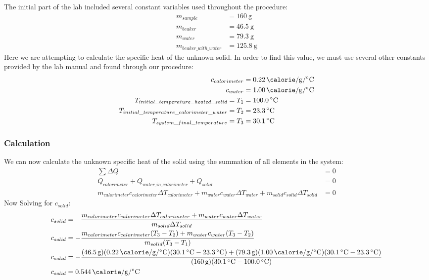 \documentclass{article}
\begin{document}
The initial part of the lab included several constant variables used throughout the procedure:
\begin{align*}
	m_{sample} & = \SI{160}{\gram} \\
	m_{beaker} & = \SI{46.5}{\gram} \\
	m_{water} & = \SI{79.3}{\gram} \\
	m_{beaker\_with\_water} & = \SI{125.8}{\gram}
\end{align*}
Here we are attempting to calculate the specific heat of the unknown solid. In order to find this value, we must use several other constants provided by the lab manual and found through our procedure:
\begin{align*}
	c_{calorimeter} & = \SI{0.22}{\calorie \per \gram \per \celsius} \\
	c_{water} & = \SI{1.00}{\calorie \per \gram \per \celsius} \\
	T_{initial\_temperature\_heated\_solid} = T_1 & = \SI{100.0}{\celsius} \\
	T_{initial\_temperature\_calorimeter\_water} = T_2 & = \SI{23.3}{\celsius} \\
	T_{system\_final\_temperature} = T_3 & = \SI{30.1}{\celsius}
\end{align*}

\subsubsection{Calculation}

We can now calculate the unknown specific heat of the solid using the summation of all elements in the system:
\begin{align*}
	\sum \Delta Q & = 0 \\
	Q_{calorimeter} + Q_{water\_in\_calorimeter} + Q_{solid} & = 0 \\
	m_{calorimeter}c_{calorimeter}\Delta T_{calorimeter} + m_{water}c_{water}\Delta T_{water} + m_{solid}c_{solid}\Delta T_{solid} & = 0
\end{align*}
Now Solving for $ c_{solid} $:
\begin{align*}
	c_{solid} & = - \frac{ m_{calorimeter}c_{calorimeter}\Delta T_{calorimeter} + m_{water}c_{water}\Delta T_{water} }{ m_{solid}\Delta T_{solid} } \\
	c_{solid} & = - \frac{ m_{calorimeter}c_{calorimeter}(T_{3} - T_{2}) + m_{water}c_{water}(T_{3} - T_{2}) }{ m_{solid}(T_{3} - T_{1}) } \\
	c_{solid} & = - \frac{ (\SI{46.5}{\gram})(\SI{0.22}{\calorie \per \gram \per \celsius})(\SI{30.1}{\celsius} - \SI{23.3}{\celsius}) + (\SI{79.3}{\gram})(\SI{1.00}{\calorie \per \gram \per \celsius})(\SI{30.1}{\celsius} - \SI{23.3}{\celsius}) }{ (\SI{160}{\gram})(\SI{30.1}{\celsius} - \SI{100.0}{\celsius}) } \\
	c_{solid} & = \SI{0.544}{\calorie \per \gram \per \celsius}
\end{align*}
\end{document}
